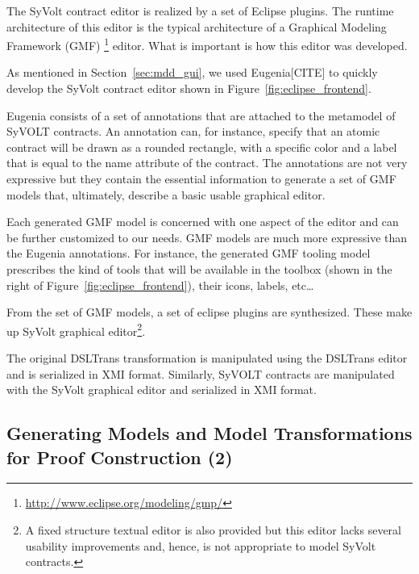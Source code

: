 The SyVolt contract editor is realized by a set of Eclipse plugins.
The runtime architecture of this editor is the typical architecture of a
Graphical Modeling Framework (GMF)
\footnote{\url{http://www.eclipse.org/modeling/gmp/}} editor.
What is important is how this editor was developed.

As mentioned in Section~\ref{sec:mdd_gui}, we used Eugenia[CITE] to quickly develop the SyVolt contract editor
shown in Figure~\ref{fig:eclipse_frontend}.

 Eugenia consists of a set of annotations that are attached
to the metamodel of SyVOLT contracts. An annotation can, for instance, specify
that an atomic contract will be drawn as a rounded rectangle, with a specific
color and a label that is equal to the name attribute of the contract.
The annotations are not very expressive but they contain the essential
information to generate a set of GMF models that, ultimately, describe a basic
usable graphical editor.

Each generated GMF model is concerned with one aspect of the editor and can be
further customized to our needs. GMF models are much more expressive than the
Eugenia annotations.
For instance, the generated GMF tooling model prescribes the kind of tools that
will be available in the toolbox (shown in the right of
Figure~\ref{fig:eclipse_frontend}), their icons, labels, etc\ldots

From the set of GMF models, a set of eclipse plugins are synthesized.
These make up SyVolt graphical editor\footnote{A fixed structure textual editor
is also provided but this editor lacks several usability improvements and,
hence, is not appropriate to model SyVolt contracts.}.

The original DSLTrans transformation is manipulated using the DSLTrans editor
and is serialized in XMI format. Similarly, SyVOLT contracts are manipulated with the SyVolt graphical
editor and serialized in XMI format.


\subsection{Generating Models and Model Transformations for Proof Construction
(2)}
\label{sec:gen_models_mt}

